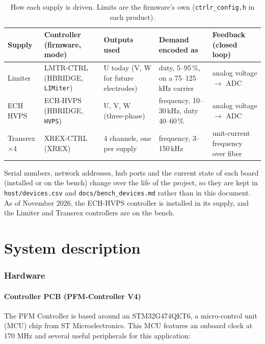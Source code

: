 \documentclass[11pt]{article}
\newcommand{\code}[1]{\texttt{#1}}
\begin{document}
\begin{table}[H]
  \centering
  \begin{tabular}{L{0.75in} L{1.0in} L{0.9in} L{1.0in} L{0.85in}}
    \hline
    \textbf{Supply} & \textbf{Controller (firmware, mode)} & \textbf{Outputs used} & \textbf{Demand encoded as} & \textbf{Feedback (closed loop)} \\
    \hline
    Limiter & LMTR-CTRL (HBRIDGE, \code{LIMiter}) & U today (V, W for future electrodes) & duty, 5--95\,\%, on a 75--125\,kHz carrier
      & analog voltage $\to$ ADC \\
    ECH HVPS & ECH-HVPS (HBRIDGE, \code{HVPS}) & U, V, W (three-phase) & frequency, 10--30\,kHz, duty 40--60\,\% & analog voltage $\to$ ADC \\
    Transrex $\times$4 & XREX-CTRL (XREX) & 4 channels, one per supply & frequency, 3--150\,kHz & unit-current frequency over fiber \\
    \hline
  \end{tabular}
  \caption{How each supply is driven. Limits are the firmware's own (\texttt{ctrlr\_config.h} in each product).}
  \label{tab:supplies}
\end{table}

Serial numbers, network addresses, hub ports and the current state of each board (installed or on the bench) change over the life of the project, so they are kept in \texttt{host/devices.csv} and \texttt{docs/bench\_devices.md} rather than in this document. As of November 2026, the ECH-HVPS controller is installed in its supply, and the Limiter and Transrex controllers are on the bench.

\part{System description}

\section{Hardware}
\label{sec:hardware}

\subsection{Controller PCB (PFM-Controller V4)}
\label{sec:pcb}

The PFM Controller is based around an STM32G474QET6, a micro-control unit (MCU) chip from ST Microelectronics. This MCU features an onboard clock at 170 MHz and several useful peripherals for this application:
\end{document}
